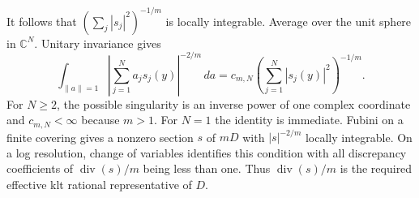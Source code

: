 It follows that $(\sum_j|s_j|^2)^{-1/m}$ is locally integrable.
Average over the unit sphere in $\mathbb C^N$.  Unitary invariance gives
\[
 \int_{\|a\|=1}\left|\sum_{j=1}^Na_js_j(y)\right|^{-2/m}\,da
 =c_{m,N}\left(\sum_{j=1}^N|s_j(y)|^2\right)^{-1/m}.
\]
For $N\ge2$, the possible singularity is an inverse power of one
complex coordinate and $c_{m,N}<\infty$ because $m>1$.
For $N=1$ the identity is immediate.
Fubini on a finite covering gives a nonzero section $s$ of $mD$
with $|s|^{-2/m}$ locally integrable.  On a log resolution, change of
variables identifies this condition with all discrepancy coefficients
of $\operatorname{div}(s)/m$ being less than one.  Thus
$\operatorname{div}(s)/m$ is the required effective klt rational
representative of $D$.
